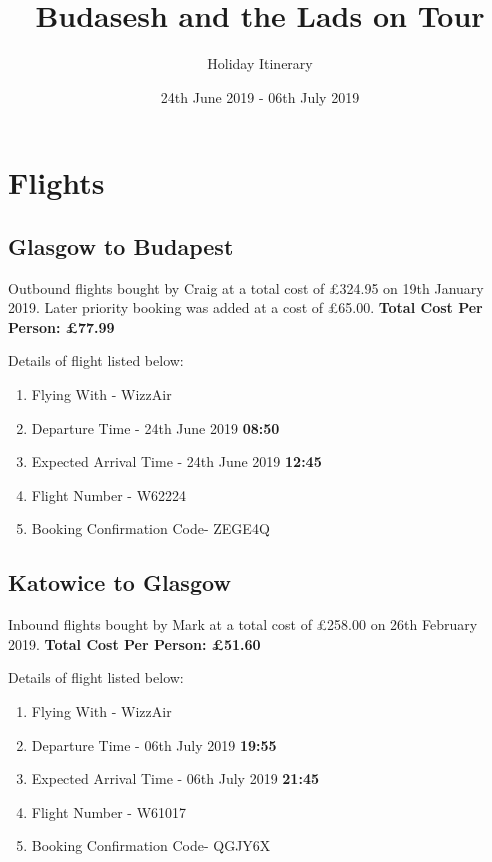 \documentclass[a4paper,12pt]{article}
\title{Budasesh and the Lads on Tour}
\author{Holiday Itinerary}
\date{24th June 2019 - 06th July 2019}
\begin{document}
\maketitle
\newpage

\section{Flights}

    \subsection*{Glasgow to Budapest}

      Outbound flights bought by Craig at a total cost of £324.95 on 19th January 2019. Later priority booking was added at a cost of £65.00. \textbf{Total Cost Per Person: £77.99 } \newline

      \noindent Details of flight listed below:

    \begin{enumerate}
      \item Flying With - WizzAir
      \item Departure Time - 24th June 2019 \textbf{08:50}
      \item Expected Arrival Time - 24th June 2019 \textbf{12:45}
      \item Flight Number - W62224
      \item Booking Confirmation Code- ZEGE4Q \newline
    \end{enumerate}



    \subsection*{Katowice to Glasgow}
      Inbound flights bought by Mark at a total cost of £258.00 on 26th February 2019. \textbf{Total Cost Per Person: £51.60} \newline

      \noindent Details of flight listed below:

    \begin{enumerate}
      \item Flying With - WizzAir
      \item Departure Time - 06th July 2019 \textbf{19:55}
      \item Expected Arrival Time - 06th July 2019 \textbf{21:45}
      \item Flight Number - W61017
      \item Booking Confirmation Code- QGJY6X \newline
    \end{enumerate}
\end{document}
